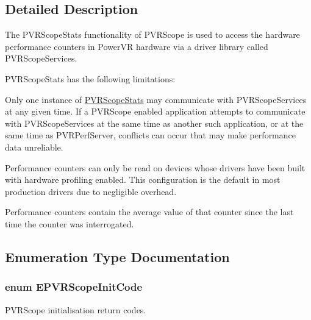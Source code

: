 \subsection{Detailed Description}
The P\+V\+R\+Scope\+Stats functionality of P\+V\+R\+Scope is used to access the hardware performance counters in Power\+V\+R hardware via a driver library called P\+V\+R\+Scope\+Services. 

P\+V\+R\+Scope\+Stats has the following limitations\+: \begin{DoxyItemize}
\item Only one instance of \hyperlink{group___scope_stats}{P\+V\+R\+Scope\+Stats} may communicate with P\+V\+R\+Scope\+Services at any given time. If a P\+V\+R\+Scope enabled application attempts to communicate with P\+V\+R\+Scope\+Services at the same time as another such application, or at the same time as P\+V\+R\+Perf\+Server, conflicts can occur that may make performance data unreliable. \item Performance counters can only be read on devices whose drivers have been built with hardware profiling enabled. This configuration is the default in most production drivers due to negligible overhead. \item Performance counters contain the average value of that counter since the last time the counter was interrogated. \end{DoxyItemize}


\subsection{Enumeration Type Documentation}
\hypertarget{group___scope_stats_gae53be0f580f9e1088efc1c06d94002d3}{
\subsubsection[{E\+P\+V\+R\+Scope\+Init\+Code}]{\setlength{\rightskip}{0pt plus 5cm}enum {\bf E\+P\+V\+R\+Scope\+Init\+Code}}}\label{group___scope_stats_gae53be0f580f9e1088efc1c06d94002d3}


P\+V\+R\+Scope initialisation return codes. 



